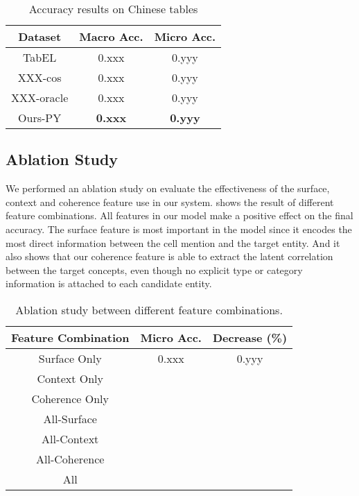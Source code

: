 \begin{table}[ht]
    \label{tab:main-result}
    \centering
    \caption{Accuracy results on Chinese tables}
    \begin{tabular} {c|cc}
        Dataset     &   Macro Acc.  & Micro Acc.    \\
        \hline
        TabEL       &   0.xxx       & 0.yyy         \\
        XXX-cos     &   0.xxx       & 0.yyy         \\
        XXX-oracle  &   0.xxx       & 0.yyy         \\
        \hline
        Ours-PY     &   \textbf{0.xxx}       & \textbf{0.yyy}         \\
    \end{tabular}
\end{table}


\subsection{Ablation Study}

We performed an ablation study on evaluate the effectiveness of the surface,
context and coherence feature use in our system.
 shows the result of different feature combinations.
All features in our model make a positive effect on the final accuracy.
The surface feature is most important in the model since it encodes
the most direct information between the cell mention and the target entity.
And it also shows that our coherence feature is able to extract the latent correlation
between the target concepts, even though no explicit type or category information
is attached to each candidate entity.

\begin{table}[ht]
    \label{tab:ablation}
    \centering
    \caption{Ablation study between different feature combinations.}
    \begin{tabular} {c|c|c}
        Feature Combination &   Micro Acc.  & Decrease (\%) \\
        \hline
        Surface Only        &   0.xxx       & 0.yyy \\
        Context Only        &       &       \\
        Coherence Only      &       &       \\
        All-Surface         &       &       \\
        All-Context         &       &       \\
        All-Coherence       &       &       \\
        \hline
        All                 &       &       \\
    \end{tabular}
\end{table}
